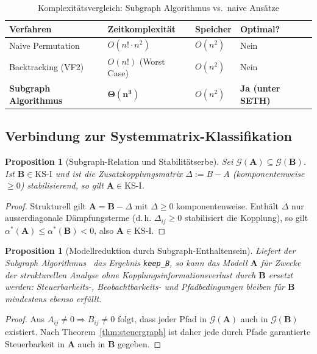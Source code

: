 \documentclass[a4paper, 12pt, twoside, openright]{report}
\newtheorem{proposition}[theorem]{Proposition}
\theoremstyle{definition}
\theoremstyle{definition}
\newcommand{\vA}{\bm{A}}
\newcommand{\vB}{\bm{B}}
\newcommand{\KS}{\mathrm{KS}}
\begin{document}
\begin{table}[H]
\centering
\caption{Komplexitätsvergleich: Subgraph Algorithmus vs.\ naive Ansätze}
\label{tab:komplex_subgraph}
\begin{tabular}{llll}
\toprule
Verfahren & Zeitkomplexität & Speicher & Optimal? \\
\midrule
Naive Permutation & $O(n! \cdot n^2)$ & $O(n^2)$ & Nein \\
Backtracking (VF2) & $O(n!)$ (Worst Case) & $O(n^2)$ & Nein \\
\textbf{Subgraph Algorithmus} & $\bm{\Theta(n^3)}$ & $O(n^2)$ & \textbf{Ja (unter SETH)} \\
\bottomrule
\end{tabular}
\end{table}

\subsection{Verbindung zur Systemmatrix-Klassifikation}

\begin{proposition}[Subgraph-Relation und Stabilitätserbe]
\label{prop:stabilitaetserbe}
Sei $\mathcal{G}(\vA) \subseteq \mathcal{G}(\vB)$. Ist $\vB \in \KS\text{-I}$ und
ist die Zusatzkopplungsmatrix $\Delta := B - A$ (komponentenweise $\geq 0$)
stabilisierend, so gilt $\vA \in \KS\text{-I}$.
\end{proposition}

\begin{proof}
Strukturell gilt $\vA = \vB - \Delta$ mit $\Delta \geq 0$ komponentenweise.
Enthält $\Delta$ nur ausserdiagonale Dämpfungsterme (d.\,h. $\Delta_{ij} \geq 0$
stabilisiert die Kopplung), so gilt $\alpha^*(\vA) \leq \alpha^*(\vB) < 0$, also $\vA \in \KS\text{-I}$.
\end{proof}

\begin{proposition}[Modellreduktion durch Subgraph-Enthaltensein]
\label{prop:modellreduktion}
Liefert der Subgraph Algorithmus~\citep{epp2026subgraph} das Ergebnis \texttt{keep\_B},
so kann das Modell $\vA$ für Zwecke der strukturellen Analyse ohne
Kopplungsinformationsverlust durch $\vB$ ersetzt werden: Steuerbarkeits-,
Beobachtbarkeits- und Pfadbedingungen bleiben für $\vB$ mindestens ebenso erfüllt.
\end{proposition}

\begin{proof}
Aus $A_{ij} \neq 0 \Rightarrow B_{ij} \neq 0$ folgt, dass jeder Pfad in
$\mathcal{G}(\vA)$ auch in $\mathcal{G}(\vB)$ existiert. Nach
Theorem~\ref{thm:steuergraph} ist daher jede durch Pfade garantierte Steuerbarkeit
in $\vA$ auch in $\vB$ gegeben.
\end{proof}
\end{document}
